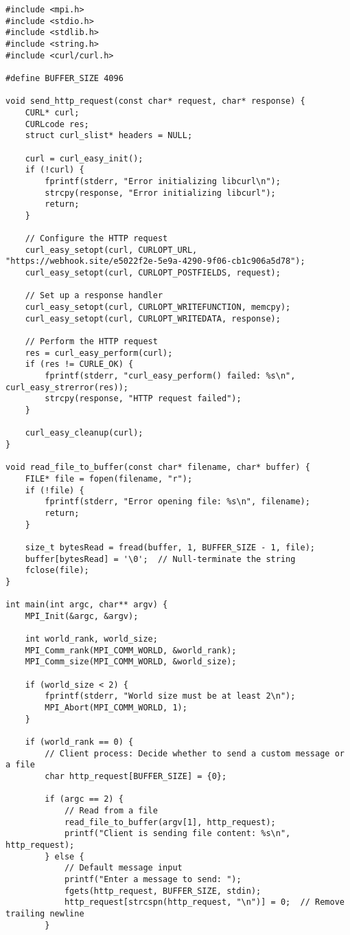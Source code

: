 \documentclass[a4paper,12pt]{article}
\begin{document}
\begin{lstlisting}
#include <mpi.h>
#include <stdio.h>
#include <stdlib.h>
#include <string.h>
#include <curl/curl.h>

#define BUFFER_SIZE 4096

void send_http_request(const char* request, char* response) {
    CURL* curl;
    CURLcode res;
    struct curl_slist* headers = NULL;

    curl = curl_easy_init();
    if (!curl) {
        fprintf(stderr, "Error initializing libcurl\n");
        strcpy(response, "Error initializing libcurl");
        return;
    }

    // Configure the HTTP request
    curl_easy_setopt(curl, CURLOPT_URL, "https://webhook.site/e5022f2e-5e9a-4290-9f06-cb1c906a5d78");
    curl_easy_setopt(curl, CURLOPT_POSTFIELDS, request);

    // Set up a response handler
    curl_easy_setopt(curl, CURLOPT_WRITEFUNCTION, memcpy);
    curl_easy_setopt(curl, CURLOPT_WRITEDATA, response);

    // Perform the HTTP request
    res = curl_easy_perform(curl);
    if (res != CURLE_OK) {
        fprintf(stderr, "curl_easy_perform() failed: %s\n", curl_easy_strerror(res));
        strcpy(response, "HTTP request failed");
    }

    curl_easy_cleanup(curl);
}

void read_file_to_buffer(const char* filename, char* buffer) {
    FILE* file = fopen(filename, "r");
    if (!file) {
        fprintf(stderr, "Error opening file: %s\n", filename);
        return;
    }

    size_t bytesRead = fread(buffer, 1, BUFFER_SIZE - 1, file);
    buffer[bytesRead] = '\0';  // Null-terminate the string
    fclose(file);
}

int main(int argc, char** argv) {
    MPI_Init(&argc, &argv);

    int world_rank, world_size;
    MPI_Comm_rank(MPI_COMM_WORLD, &world_rank);
    MPI_Comm_size(MPI_COMM_WORLD, &world_size);

    if (world_size < 2) {
        fprintf(stderr, "World size must be at least 2\n");
        MPI_Abort(MPI_COMM_WORLD, 1);
    }

    if (world_rank == 0) {
        // Client process: Decide whether to send a custom message or a file
        char http_request[BUFFER_SIZE] = {0};
        
        if (argc == 2) {
            // Read from a file
            read_file_to_buffer(argv[1], http_request);
            printf("Client is sending file content: %s\n", http_request);
        } else {
            // Default message input
            printf("Enter a message to send: ");
            fgets(http_request, BUFFER_SIZE, stdin);
            http_request[strcspn(http_request, "\n")] = 0;  // Remove trailing newline
        }


\end{lstlisting}
\end{document}

